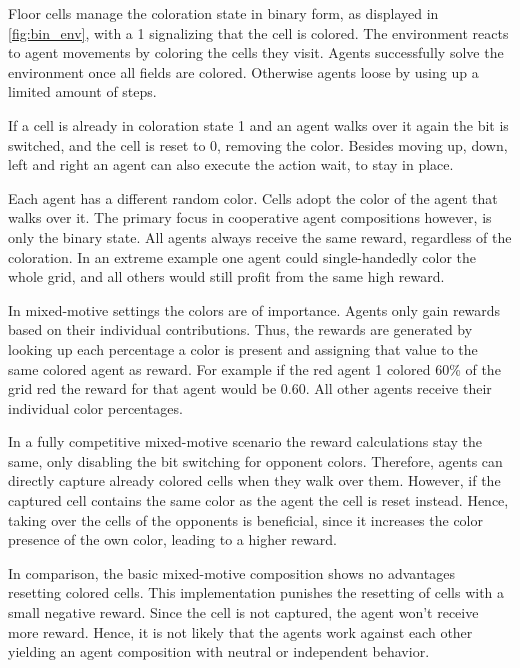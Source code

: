 Floor cells manage the coloration state in binary form, as displayed in \ref{fig:bin_env}, with a 1 signalizing that the cell is colored. The environment reacts to agent movements by coloring the cells they visit. Agents successfully solve the environment once all fields are colored. Otherwise agents loose by using up a limited amount of steps.

If a cell is already in coloration state 1 and an agent walks over it again the bit is switched, and the cell is reset to 0, removing the color. Besides moving up, down, left and right an agent can also execute the action wait, to stay in place.

Each agent has a different random color. Cells adopt the color of the agent that walks over it. The primary focus in cooperative agent compositions however, is only the binary state. All agents always receive the same reward, regardless of the coloration. In an extreme example one agent could single-handedly color the whole grid, and all others would still profit from the same high reward.

In mixed-motive settings the colors are of importance. Agents only gain rewards based on their individual contributions. Thus, the rewards are generated by looking up each percentage a color is present and assigning that value to the same colored agent as reward. For example if the red agent 1 colored 60\% of the grid red the reward for that agent would be 0.60. All other agents receive their individual color percentages.

In a fully competitive mixed-motive scenario the reward calculations stay the same, only disabling the bit switching for opponent colors. Therefore, agents can directly capture already colored cells when they walk over them. However, if the captured cell contains the same color as the agent the cell is reset instead. Hence, taking over the cells of the opponents is beneficial, since it increases the color presence of the own color, leading to a higher reward.

In comparison, the basic mixed-motive composition shows no advantages resetting colored cells. This implementation punishes the resetting of cells with a small negative reward. Since the cell is not captured, the agent won't receive more reward. Hence, it is not likely that the agents work against each other yielding an agent composition with neutral or independent behavior.

